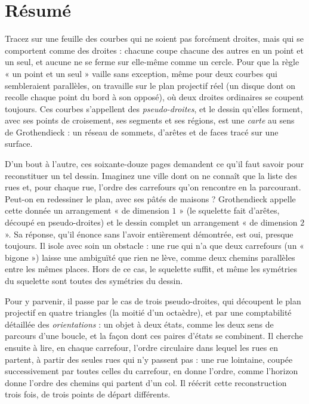 \documentclass[11pt,a4paper]{article}
\begin{document}
\section*{Résumé}

\begin{resume}
Tracez sur une feuille des courbes qui ne soient pas forcément droites, mais
qui se comportent comme des droites : chacune coupe chacune des autres en un
point et un seul, et aucune ne se ferme sur elle-même comme un cercle. Pour
que la règle « un point et un seul » vaille sans exception, même pour deux
courbes qui sembleraient parallèles, on travaille sur le plan projectif réel
(un disque dont on recolle chaque point du bord à son opposé), où deux
droites ordinaires se coupent toujours. Ces courbes s'appellent des
\emph{pseudo-droites}, et le dessin qu'elles forment, avec ses points de
croisement, ses segments et ses régions, est une \emph{carte} au sens de
Grothendieck : un réseau de sommets, d'arêtes et de faces tracé sur une
surface.

D'un bout à l'autre, ces soixante-douze pages demandent ce qu'il faut
savoir pour reconstituer un tel dessin. Imaginez une ville dont on
ne connaît que la liste des rues et, pour chaque rue, l'ordre des carrefours
qu'on rencontre en la parcourant. Peut-on en redessiner le plan, avec ses
pâtés de maisons ? Grothendieck appelle cette donnée un arrangement
« de dimension $1$ » (le squelette fait d'arêtes, découpé en
pseudo-droites) et le dessin complet un arrangement « de dimension $2$ ».
Sa réponse, qu'il énonce sans l'avoir entièrement démontrée, est oui,
presque toujours. Il isole avec soin un obstacle : une rue qui n'a que deux carrefours (un « bigone ») laisse une
ambiguïté que rien ne lève, comme deux chemins parallèles entre les mêmes
places. Hors de ce cas, le squelette suffit, et même les symétries du
squelette sont toutes des symétries du dessin.

Pour y parvenir, il passe par le cas de trois pseudo-droites, qui découpent
le plan projectif en quatre triangles (la moitié d'un octaèdre), et par une
comptabilité détaillée des \emph{orientations} : un objet à deux états,
comme les deux sens de parcours d'une boucle, et la façon dont ces paires
d'états se combinent. Il cherche ensuite à lire, en chaque carrefour, l'ordre
circulaire dans lequel les rues en partent, à partir des seules rues qui n'y
passent pas : une rue lointaine, coupée successivement par toutes celles du
carrefour, en donne l'ordre, comme l'horizon donne l'ordre des chemins qui
partent d'un col. Il réécrit cette reconstruction trois fois, de trois points
de départ différents.


\end{resume}
\end{document}
